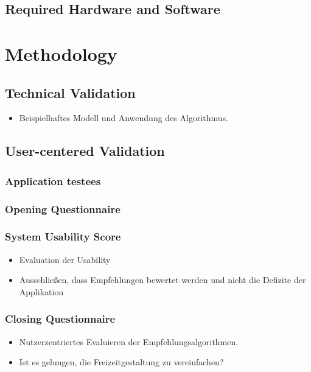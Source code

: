 \documentclass[12pt,numbers=noenddot,parskip,bibliography=totocnumbered,listof=totocnumbered]{scrreprt}
\begin{document}
\section{Required Hardware and Software}

\chapter{Methodology}

\section{Technical Validation}
\begin{itemize} 
	\item Beispielhaftes Modell und Anwendung des Algorithmus.
\end{itemize} 

\section{User-centered Validation}

\subsection{Application testees}

\subsection{Opening Questionnaire}

\subsection{System Usability Score}
\begin{itemize} 
	\item Evaluation der Usability
	\item Ausschließen, dass Empfehlungen bewertet werden und nicht die Defizite der Applikation
\end{itemize} 

\subsection{Closing Questionnaire}
\begin{itemize} 
	\item Nutzerzentriertes Evaluieren der Empfehlungsalgorithmen.
	\item Ist es gelungen, die Freizeitgestaltung zu vereinfachen?
\end{itemize} 
\end{document}
